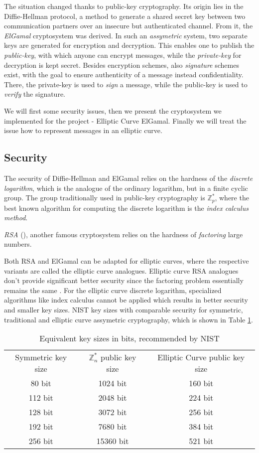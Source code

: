 \documentclass[11pt,english]{article}
\begin{document}
The situation changed thanks to public-key cryptography. Its origin lies in the Diffie-Hellman \cite{Diffie76newdirections} protocol, a method to generate a shared secret key between two communication partners over an insecure but authenticated channel. From it, the \emph{ElGamal} cryptosystem \cite{19480} was derived. In such an \emph{assymetric} system, two separate keys are generated for encryption and decryption. This enables one to publish the \emph{public-key}, with which anyone can encrypt messages, while the \emph{private-key} for decryption is kept secret. Besides encryption schemes, also \emph{signature} schemes exist, with the goal to ensure authenticity of a message instead confidentiality. There, the private-key is used to \emph{sign} a message, while the public-key is used to \emph{verify} the signature.

We will first some security issues, then we present the cryptosystem we implemented for the project - Elliptic Curve ElGamal. Finally we will treat the issue how to represent messages in an elliptic curve.

\subsection{Security}
The security of Diffie-Hellman and ElGamal relies on the hardness of the \emph{discrete logarithm}, which is the analogue of the ordinary logarithm, but in a finite cyclic group. The group traditionally used in public-key cryptography is $\mathbb{Z}_p^*$, where the best known algorithm for computing the discrete logarithm is the \emph{index calculus method}.

\emph{RSA} (\cite{Rivest78amethod}), another famous cryptosystem relies on the hardness of \emph{factoring} large numbers.

Both RSA and ElGamal can be adapted for elliptic curves, where the respective variants are called the elliptic curve analogues. Elliptic curve RSA analogues don't provide significant better security since the factoring problem essentially remains the same \cite{343485}. For the elliptic curve discrete logarithm, specialized algorithms like index calculus cannot be applied which results in better security and smaller key sizes. NIST key sizes with comparable security for symmetric, traditional and elliptic curve assymetric cryptography, which is shown in Table \ref{eqks}.

\begin{table}
\centering
\begin{tabular}{c|c|c}
Symmetric key size & $\mathbb{Z}_{n}^{*}$ public key size & Elliptic Curve public key size \\ \cline{1-3}
80 bit & 1024 bit & 160 bit \\ 
112 bit & 2048 bit & 224 bit \\ 
128 bit & 3072 bit & 256 bit \\ 
192 bit & 7680 bit & 384 bit \\ 
256 bit & 15360 bit & 521 bit
\end{tabular}
\caption{Equivalent key sizes in bits, recommended by NIST}
\label{eqks}
\end{table}
\end{document}
